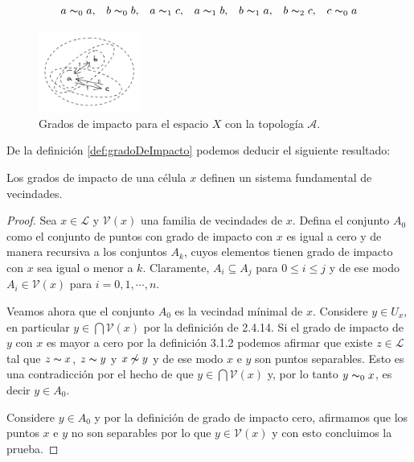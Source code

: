 $$\begin{array}{ccccccc}
    a\thicksim_0 a, & b\thicksim_0 b, & a\thicksim_1 c, & a\thicksim_1 b, &
    b\thicksim_1 a, & b\thicksim_2 c, & c\thicksim_0 a
\end{array}$$
\begin{figure}[h]
  \centering
    \includegraphics[width=0.3\textwidth]{Imagenes/grados_de_impacto.PNG}
  \caption{Grados de impacto para el espacio $X$ con la topología $\mathcal{A}$.}
  \label{fig:gradoImpacto}
\end{figure}

De la definición \ref{def:gradoDeImpacto} podemos deducir el siguiente resultado:

\begin{teorema}\label{teo:gradeosDeImpactoImplicaSFV}
Los grados de impacto de una célula $x$ definen un sistema fundamental de vecindades.
\end{teorema}
\begin{proof}
Sea $x\in\mathcal{L}$ y $\mathcal{V}(x)$ una familia de vecindades de $x$. Defina el conjunto $A_0$ como el conjunto de puntos con grado de impacto con $x$ es igual a cero y de manera recursiva a los conjuntos $A_k$, cuyos elementos tienen grado de impacto con $x$ sea igual o menor a $k$. Claramente, $A_i\subseteq A_j$ para $0\leq i\leq j$ y de ese modo $A_i\in\mathcal{V}(x)$ para $i=0,1,\cdots,n$.

Veamos ahora que el conjunto $A_0$ es la vecindad mínimal de $x$. Considere $y\in U_x$, en particular $y\in\bigcap\mathcal{V}(x)$ por la definición de 2.4.14. Si el grado de impacto de $y$ con $x$ es mayor a cero por la definición 3.1.2 podemos afirmar que existe $z\in\mathcal{L}$ tal que $z\thicksim x$, $z\thicksim y$ y $x\not\thicksim y$ y de ese modo $x$ e $y$ son puntos separables. Esto es una contradicción por el hecho de que $y\in \bigcap \mathcal{V}(x)$ y, por lo tanto $y\thicksim_0 x$, es decir $y\in A_0$.

Considere $y\in A_0$ y por la definición de grado de impacto cero, afirmamos que los puntos $x$ e $y$ no son separables por lo que $y\in\mathcal{V}(x)$ y con esto concluimos la prueba.
\end{proof}

